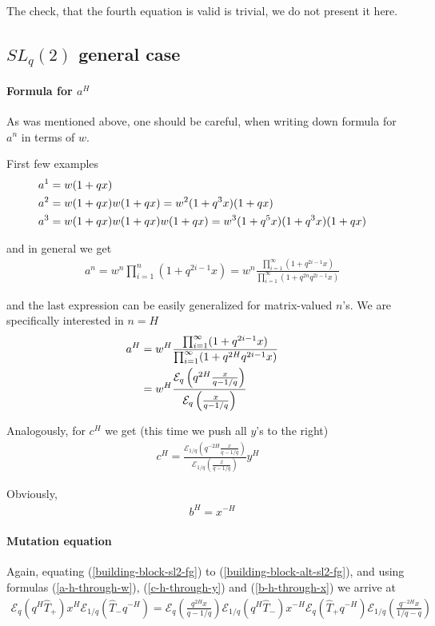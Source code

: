 \documentclass{article}
\newcommand{\lb}{\left (}
\newcommand{\rb}{\right )}
\newcommand {\?}{\textit{???}}
\newcommand{\me}[0]{\mathcal{E}}
\newcommand{\hT}[0]{\hat{T}}
\newcommand{\delabel}[1]{(\ref{#1})}
\begin{document}
The check, that the fourth equation is valid is trivial, we do not present it here.

\subsection{$SL_q(2)$ general case}
\paragraph{Formula for $a^H$}
As was mentioned above, one should be careful, when writing down formula for $a^n$ in terms of $w$.

First few examples
\begin{align}
& a^1 = w(1 + q x) & \\ \notag
& a^2 = w(1 + q x) w (1 + q x) = w^2 (1 + q^3 x) (1 + q x) & \\ \notag
& a^3 = w(1 + q x) w (1 + q x) w (1 + q x) = w^3 (1 + q^5 x) (1 + q^3 x) (1 + q x) &
\end{align}

and in general we get
\begin{align}
& a^n = w^n \prod_{i = 1}^n (1 + q^{2 i - 1} x) = w^n
  \frac{\prod_{i = 1}^\infty (1 + q^{2i -1} x)}{\prod_{i = 1}^\infty (1 + q^{2n} q^{2i -1} x)}
\end{align}

and the last expression can be easily generalized for matrix-valued $n$'s.
We are specifically interested in $n = H$
\begin{align}
\label{a-h-through-w}
a^H & = w^H \frac{\prod_{i = 1}^\infty (1 + q^{2i -1} x)}{\prod_{i = 1}^\infty (1 + q^{2H} q^{2i -1} x)} & \\ \notag
& = w^H \frac{\me_q \lb q^{2H} \frac{x}{q - 1/q} \rb}{\me_q \lb \frac{x}{q - 1/q} \rb}
\end{align}

Analogously, for $c^H$ we get (this time we push all $y$'s to the right)
\begin{align}
\label{c-h-through-y}
c^H = \frac{\me_{1/q} \lb q^{-2H} \frac{x}{q - 1/q} \rb}{\me_{1/q} \lb \frac{x}{q - 1/q} \rb} y^H
\end{align}

Obviously,
\begin{align}
\label{b-h-through-x}
& b^H = x^{-H}
\end{align}

\paragraph{Mutation equation}
Again, equating \delabel{building-block-sl2-fg} to \delabel{building-block-alt-sl2-fg},
and using formulas \delabel{a-h-through-w}, \delabel{c-h-through-y} and \delabel{b-h-through-x}
we arrive at
\begin{align}
\label{mutation-sl2-main-equation}
\me_q(q^H \hT_+) x^H \me_{1/q}(\hT_- q^{-H}) = \me_q\lb \frac{q^{2H} x}{q - 1/q}\rb
\me_{1/q}(q^H \hT_-) x^{-H} \me_{q}(\hT_+ q^{-H}) \me_{1/q}\lb \frac{q^{-2H} x}{1/q - q}\rb
\end{align}
\end{document}
